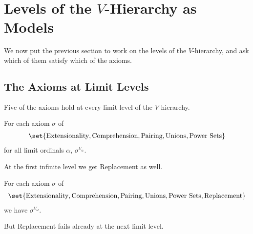 \section{Levels of the $V$-Hierarchy as Models}

We now put the previous section to work on the levels of the $V$-hierarchy, and ask which of them satisfy which of the axioms.

\subsection{The Axioms at Limit Levels}

Five of the axioms hold at every limit level of the $V$-hierarchy.

\begin{boxproposition}
    For each axiom $\sigma$ of
    \begin{align*}
        \set{\text{Extensionality}, \text{Comprehension}, \text{Pairing}, \text{Unions}, \text{Power Sets}}
    \end{align*}
    for all limit ordinals $\alpha$, $\sigma^{V_{\alpha}}$.
\end{boxproposition}

At the first infinite level we get Replacement as well.

\begin{boxproposition}
    For each axiom $\sigma$ of
    \begin{align*}
        \set{\text{Extensionality}, \text{Comprehension}, \text{Pairing}, \text{Unions}, \text{Power Sets}, \text{Replacement}}
    \end{align*}
    we have $\sigma^{V_{\omega}}$.
\end{boxproposition}

But Replacement fails already at the next limit level.

